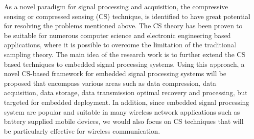 As a novel paradigm for signal processing and acquisition, the compressive sensing or compressed sensing (CS) technique, is identified to have great potential for resolving the problems mentioned above. The CS theory has been proven to be suitable for numerous computer science and electronic engineering based applications, where it is possible to overcome the limitation of the traditional sampling theory. The main idea of the research work is to further extend the CS based techniques to embedded signal processing systems. Using this approach, a novel CS-based framework for embedded signal processing systems will be proposed that encompass various areas such as data compression, data acquisition, data storage, data transmission optimal recovery and processing, but targeted for embedded deployment. In addition, since embedded signal processing system are popular and suitable in many wireless network applications such as battery supplied mobile devices, we would also focus on CS techniques that will be particularly effective for wireless communication.

